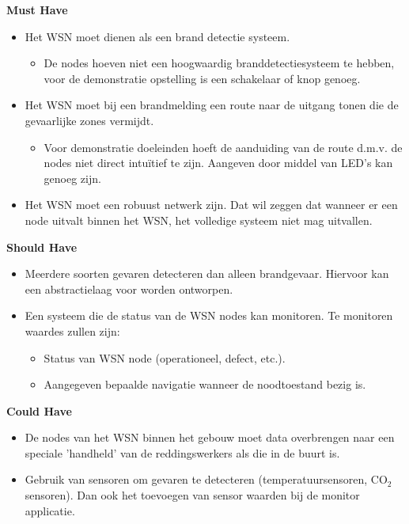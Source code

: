 \documentclass{../local}
\begin{document}
\noindent\textbf{Must Have}
\begin{itemize}
\item Het WSN moet dienen als een brand detectie systeem.
\begin{itemize}
\item De nodes hoeven niet een hoogwaardig branddetectiesysteem te hebben, voor de demonstratie opstelling is een schakelaar of knop genoeg.
\end{itemize}
\item Het WSN moet bij een brandmelding een route naar de uitgang tonen die de gevaarlijke zones vermijdt.
\begin{itemize}
\item Voor demonstratie doeleinden hoeft de aanduiding van de route d.m.v. de nodes niet direct intuïtief te zijn. Aangeven door middel van LED's kan genoeg zijn.
\end{itemize}
\item Het WSN moet een robuust netwerk zijn. Dat wil zeggen dat wanneer er een node uitvalt binnen het WSN, het volledige systeem niet mag uitvallen.
\end{itemize}

\noindent\textbf{Should Have}
\begin{itemize}
\item Meerdere soorten gevaren detecteren dan alleen brandgevaar. Hiervoor kan een abstractielaag voor worden ontworpen.
\item Een systeem die de status van de WSN nodes kan monitoren. Te monitoren waardes zullen zijn:
\begin{itemize}
\item Status van WSN node (operationeel, defect, etc.).
\item Aangegeven bepaalde navigatie wanneer de noodtoestand bezig is.
\end{itemize}
\end{itemize}

\noindent\textbf{Could Have}
\begin{itemize}
\item De nodes van het WSN binnen het gebouw moet data overbrengen naar een speciale 'handheld' van de reddingswerkers als die in de buurt is.
\item Gebruik van sensoren om gevaren te detecteren (temperatuursensoren, CO$_{2}$ sensoren). Dan ook het toevoegen van sensor waarden bij de monitor applicatie.
\end{itemize}
\end{document}
